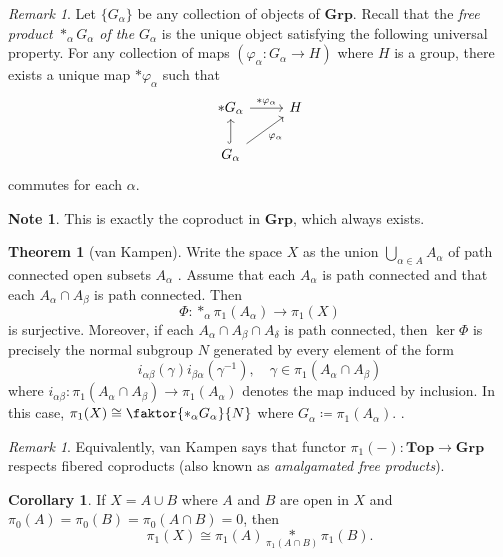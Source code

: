 \documentclass[10pt,letterpaper,cm]{nupset}
\theoremstyle{definition}
\newtheorem{note}[definition]{Note}
\theoremstyle{theorem}
\newtheorem{theorem}[definition]{Theorem}
\newtheorem{corollary}[definition]{Corollary}
\theoremstyle{remark}
\newtheorem{remark}[definition]{Remark}
\newcommand{\1}{\mathbb{1}}
\newcommand{\0}{\vec 0}
\begin{document}
\begin{remark}
Let $\{G_{\alpha}\}$ be any collection of objects of $\mathbf{Grp}$. Recall that the \textit{free product $\ast_{\alpha} G_{\alpha}$ of the $G_{\alpha}$} is the unique object satisfying the following universal property.   For any collection of maps $(\varphi_{\alpha}: G_{\alpha} \to H)$ where $H$ is a group, there exists a unique map $\ast \varphi_{\alpha}$ such that
\[
\begin{tikzcd}
\ast G_{\alpha} \arrow[r, "\ast \varphi_{\alpha}"] & H \\
G_{\alpha} \arrow[ru, "\varphi_{\alpha}"'] \arrow[u, hook] & 
\end{tikzcd}
\] commutes for each $\alpha$.
\end{remark}

\begin{note}
This is exactly the coproduct in $\mathbf{Grp}$, which always exists.
\end{note}

\begin{theorem}[van Kampen]
Write the space $X$ as the union $\bigcup_{\alpha \in A} A_{\alpha}$ of path connected open subsets $A_{\alpha}$ . Assume that each $A_{\alpha}$ is path connected and that each $A_{\alpha} \cap A_{\beta}$ is path connected. Then $$\Phi : \ast_{\alpha} \pi_1(A_{\alpha}) \to \pi_1(X)$$ is surjective. Moreover, if each $A_{\alpha} \cap A_{\beta} \cap A_{\delta}$ is path connected, then $\ker{\Phi}$ is precisely the normal subgroup $N$ generated by every element of the form $$ i_{\alpha \beta} (\gamma ) i_{\beta \alpha}(\gamma^{-1}), \quad \gamma \in \pi_1(A_{\alpha} \cap A_{\beta})$$ where $i_{\alpha \beta} : \pi_1(A_{\alpha} \cap A_{\beta}) \to \pi_1(A_{\alpha})$ denotes the map induced by inclusion.  In this case, $\pi_1(X) \cong \faktor{\ast_{\alpha} G_{\alpha}}{N}$ where $G_{\alpha} \coloneqq  \pi_1(A_{\alpha})$. .
\end{theorem}

\begin{remark}
Equivalently, van Kampen says that functor $\pi_1(-) : \mathbf{Top} \to \mathbf{Grp}$ respects fibered coproducts (also known as \textit{amalgamated free products}).
\end{remark}

\begin{corollary}
If $X = A \cup B$ where $A$ and $B$ are open in $X$ and $\pi_0(A) = \pi_0(B) = \pi_0(A \cap B) = 0$, then $$\pi_1(X) \cong \pi_1(A) \underset{\pi_1(A\cap B)}{\ast} \pi_1(B).  $$
\end{corollary}
\end{document}
